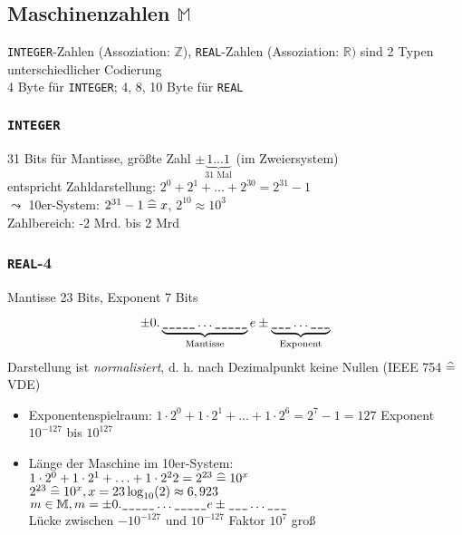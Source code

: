 \subsection{Maschinenzahlen $\mathbb{M}$}

\begingroup
\newcommand{\integer}{\texttt{INTEGER}}
\newcommand{\real}{\texttt{REAL}}

\integer-Zahlen (Assoziation: $\mathbb{Z}$), \real-Zahlen (Assoziation: $\mathbb{R})$ sind 2 Typen unterschiedlicher Codierung\\
4 Byte für \integer; 4, 8, 10 Byte für \real

\subsubsection*{\integer}

31 Bits für Mantisse, größte Zahl $\pm \underbrace{1\ldots1}_{31\text{ Mal}}$ (im Zweiersystem)\\
entspricht Zahldarstellung: $2^0+2^1+\ldots+2^{30}=2^{31}-1$ \\
$\leadsto$ 10er-System: $2^{31}-1 \mathrel{\widehat{=}} x$, $2^{10}\approx 10^3$\\
Zahlbereich: -2 Mrd. bis 2 Mrd

\subsubsection*{\real-4}

Mantisse 23 Bits, Exponent 7 Bits

\begin{equation*}
\pm 0.\underbrace{\text{\ttfamily\_\_\_\_\_}\ldots\text{\ttfamily\_\_\_\_\_}}_{\text{Mantisse}}e\pm\underbrace{\text{\ttfamily\_\_\_}\ldots\text{\ttfamily\_\_\_}}_{\text{Exponent}}
\end{equation*}
Darstellung ist \emph{normalisiert}, d. h. nach Dezimalpunkt keine Nullen (IEEE 754 $\mathrel{\widehat{=}}$ VDE)

\begin{itemize}
 \item Exponentenspielraum: $1\cdot 2^0+1\cdot2^1+\ldots+1\cdot2^6 = 2^7 -1 = 127$
  Exponent $10^{-127}$ bis $10^{127}$
 \item Länge der Maschine im 10er-System:\\
$1\cdot 2^0+1\cdot2^1+\ldots+1\cdot2^22=2^{23} \mathrel{\widehat{=}} 10^x$\\
$2^{23}\mathrel{\widehat{=}} 10^x, x=23 \log_{10}(2) \approx 6,923 $\\
$m \in \mathbb{M}, m=\pm 0.\text{\ttfamily\_\_\_\_\_}\ldots\text{\ttfamily\_\_\_\_\_} e\pm \text{\ttfamily\_\_\_}\ldots\text{\ttfamily\_\_\_}$\\Lücke zwischen $-10^{-127}$ und $10^{-127}$ Faktor $10^7$ groß
\end{itemize}


